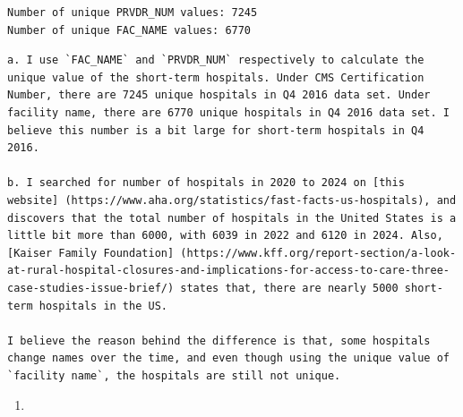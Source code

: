 \documentclass[
  letterpaper,
  DIV=11,
  numbers=noendperiod]{scrartcl}
\providecommand{\tightlist}{%
  \setlength{\itemsep}{0pt}\setlength{\parskip}{0pt}}\usepackage{longtable,booktabs,array}
\begin{document}
\begin{verbatim}
Number of unique PRVDR_NUM values: 7245
Number of unique FAC_NAME values: 6770
\end{verbatim}

\begin{verbatim}
a. I use `FAC_NAME` and `PRVDR_NUM` respectively to calculate the unique value of the short-term hospitals. Under CMS Certification Number, there are 7245 unique hospitals in Q4 2016 data set. Under facility name, there are 6770 unique hospitals in Q4 2016 data set. I believe this number is a bit large for short-term hospitals in Q4 2016.

b. I searched for number of hospitals in 2020 to 2024 on [this website] (https://www.aha.org/statistics/fast-facts-us-hospitals), and discovers that the total number of hospitals in the United States is a little bit more than 6000, with 6039 in 2022 and 6120 in 2024. Also, [Kaiser Family Foundation] (https://www.kff.org/report-section/a-look-at-rural-hospital-closures-and-implications-for-access-to-care-three-case-studies-issue-brief/) states that, there are nearly 5000 short-term hospitals in the US.

I believe the reason behind the difference is that, some hospitals change names over the time, and even though using the unique value of `facility name`, the hospitals are still not unique.
\end{verbatim}

\begin{enumerate}
\def\labelenumi{\arabic{enumi}.}
\tightlist
\item
\end{enumerate}
\end{document}
